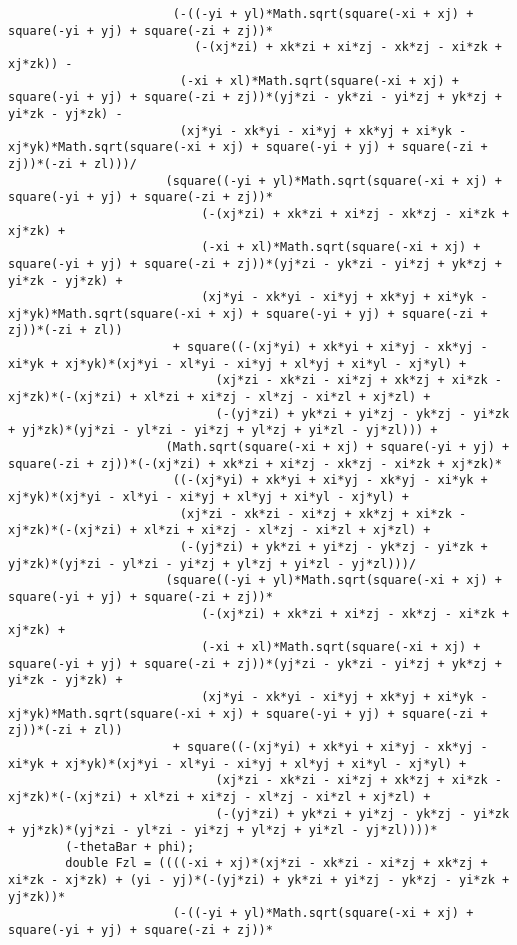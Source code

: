 \begin{lstlisting}
					   (-((-yi + yl)*Math.sqrt(square(-xi + xj) + square(-yi + yj) + square(-zi + zj))*
						  (-(xj*zi) + xk*zi + xi*zj - xk*zj - xi*zk + xj*zk)) - 
						(-xi + xl)*Math.sqrt(square(-xi + xj) + square(-yi + yj) + square(-zi + zj))*(yj*zi - yk*zi - yi*zj + yk*zj + yi*zk - yj*zk) - 
						(xj*yi - xk*yi - xi*yj + xk*yj + xi*yk - xj*yk)*Math.sqrt(square(-xi + xj) + square(-yi + yj) + square(-zi + zj))*(-zi + zl)))/
					  (square((-yi + yl)*Math.sqrt(square(-xi + xj) + square(-yi + yj) + square(-zi + zj))*
						   (-(xj*zi) + xk*zi + xi*zj - xk*zj - xi*zk + xj*zk) + 
						   (-xi + xl)*Math.sqrt(square(-xi + xj) + square(-yi + yj) + square(-zi + zj))*(yj*zi - yk*zi - yi*zj + yk*zj + yi*zk - yj*zk) + 
						   (xj*yi - xk*yi - xi*yj + xk*yj + xi*yk - xj*yk)*Math.sqrt(square(-xi + xj) + square(-yi + yj) + square(-zi + zj))*(-zi + zl))
					   + square((-(xj*yi) + xk*yi + xi*yj - xk*yj - xi*yk + xj*yk)*(xj*yi - xl*yi - xi*yj + xl*yj + xi*yl - xj*yl) + 
							 (xj*zi - xk*zi - xi*zj + xk*zj + xi*zk - xj*zk)*(-(xj*zi) + xl*zi + xi*zj - xl*zj - xi*zl + xj*zl) + 
							 (-(yj*zi) + yk*zi + yi*zj - yk*zj - yi*zk + yj*zk)*(yj*zi - yl*zi - yi*zj + yl*zj + yi*zl - yj*zl))) + 
					  (Math.sqrt(square(-xi + xj) + square(-yi + yj) + square(-zi + zj))*(-(xj*zi) + xk*zi + xi*zj - xk*zj - xi*zk + xj*zk)*
					   ((-(xj*yi) + xk*yi + xi*yj - xk*yj - xi*yk + xj*yk)*(xj*yi - xl*yi - xi*yj + xl*yj + xi*yl - xj*yl) + 
						(xj*zi - xk*zi - xi*zj + xk*zj + xi*zk - xj*zk)*(-(xj*zi) + xl*zi + xi*zj - xl*zj - xi*zl + xj*zl) + 
						(-(yj*zi) + yk*zi + yi*zj - yk*zj - yi*zk + yj*zk)*(yj*zi - yl*zi - yi*zj + yl*zj + yi*zl - yj*zl)))/
					  (square((-yi + yl)*Math.sqrt(square(-xi + xj) + square(-yi + yj) + square(-zi + zj))*
						   (-(xj*zi) + xk*zi + xi*zj - xk*zj - xi*zk + xj*zk) + 
						   (-xi + xl)*Math.sqrt(square(-xi + xj) + square(-yi + yj) + square(-zi + zj))*(yj*zi - yk*zi - yi*zj + yk*zj + yi*zk - yj*zk) + 
						   (xj*yi - xk*yi - xi*yj + xk*yj + xi*yk - xj*yk)*Math.sqrt(square(-xi + xj) + square(-yi + yj) + square(-zi + zj))*(-zi + zl))
					   + square((-(xj*yi) + xk*yi + xi*yj - xk*yj - xi*yk + xj*yk)*(xj*yi - xl*yi - xi*yj + xl*yj + xi*yl - xj*yl) + 
							 (xj*zi - xk*zi - xi*zj + xk*zj + xi*zk - xj*zk)*(-(xj*zi) + xl*zi + xi*zj - xl*zj - xi*zl + xj*zl) + 
							 (-(yj*zi) + yk*zi + yi*zj - yk*zj - yi*zk + yj*zk)*(yj*zi - yl*zi - yi*zj + yl*zj + yi*zl - yj*zl))))*
		(-thetaBar + phi);
		double Fzl = ((((-xi + xj)*(xj*zi - xk*zi - xi*zj + xk*zj + xi*zk - xj*zk) + (yi - yj)*(-(yj*zi) + yk*zi + yi*zj - yk*zj - yi*zk + yj*zk))*
					   (-((-yi + yl)*Math.sqrt(square(-xi + xj) + square(-yi + yj) + square(-zi + zj))*

\end{lstlisting}
